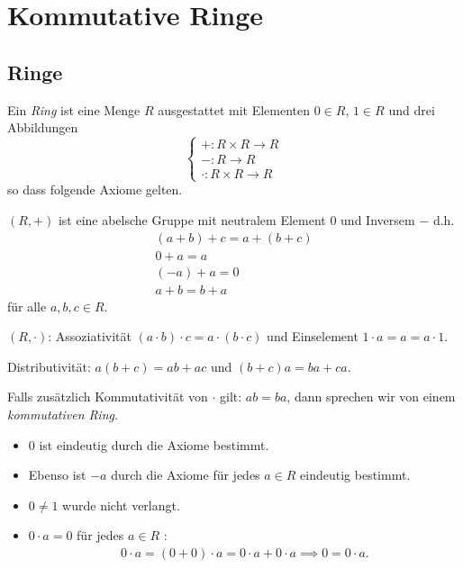 \graphicspath{{Images/}}

\chapter{Kommutative Ringe}

\section{Ringe}

\begin{definition}
	Ein \emph{Ring} ist eine Menge $R$ ausgestattet mit Elementen $0 \in R$, $1 \in R$ und drei Abbildungen
	\[
		\begin{cases}
			+: R \times R \to R\\
			-: R \to R\\
			\cdot: R \times R \to R
		\end{cases}
	\]
	so dass folgende Axiome gelten.

	$(R,+)$ ist eine abelsche Gruppe mit neutralem Element $0$ und Inversem $-$ d.h.
	\begin{gather*}
		(a+b) + c = a + (b+c)\\
		0 + a = a\\
		(-a) + a = 0\\
		a + b = b + a
	\end{gather*}
	für alle $a,b,c \in R$.

	$(R,\cdot)$: Assoziativität $(a\cdot b) \cdot c = a \cdot (b \cdot c)$ und Einselement $1 \cdot a = a = a \cdot 1$.

	Distributivität: $a ( b + c) = ab + ac$ und $(b+c) a = ba + ca$.

	Falls zusätzlich Kommutativität von $\cdot$ gilt: $ab = ba$, dann sprechen wir von einem \emph{kommutativen Ring}.
\end{definition}

\begin{remark}
	\begin{itemize}	
		\item $0$ ist eindeutig durch die Axiome bestimmt. 
		\item Ebenso ist $-a$ durch die Axiome für jedes $a \in R$ eindeutig bestimmt.\\
		\item $0 \neq 1$ wurde nicht verlangt.
		\item $0 \cdot a = 0$ für jedes $a \in R$ :
			 \begin{align*}
				 0 \cdot a = (0+0) \cdot a = 0\cdot a + 0 \cdot a \implies 0 = 0 \cdot a
			.\end{align*}
	\end{itemize}
\end{remark}

